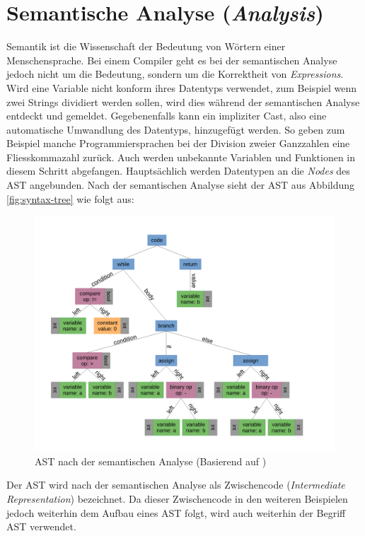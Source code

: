 \section{Semantische Analyse (\textit{Analysis})}
Semantik ist die Wissenschaft der Bedeutung von Wörtern einer Menschensprache. Bei einem Compiler geht es bei der semantischen Analyse jedoch nicht um die Bedeutung, sondern um die Korrektheit von \textit{Expressions}.
Wird eine Variable nicht konform ihres Datentyps verwendet, zum Beispiel wenn zwei Strings dividiert werden sollen, wird dies während der semantischen Analyse entdeckt und gemeldet.
Gegebenenfalls kann ein impliziter Cast, also eine automatische Umwandlung des Datentyps, hinzugefügt werden.
So geben zum Beispiel manche Programmiersprachen bei der Division zweier Ganzzahlen eine Fliesskommazahl zurück.
Auch werden unbekannte Variablen und Funktionen in diesem Schritt abgefangen.
Hauptsächlich werden Datentypen an die \textit{Nodes} des AST angebunden. Nach der semantischen Analyse sieht der AST aus Abbildung \ref{fig:syntax-tree} wie folgt aus:

\begin{figure}[H]
    \centering
    \includegraphics[scale=0.4]{resources/images/AST_with_types.pdf}
    \caption{AST nach der semantischen Analyse (Basierend auf \cite{img:AST})}
    \label{fig:syntax-tree-with-types}
\end{figure}

Der AST wird nach der semantischen Analyse als Zwischencode (\textit{Intermediate Representation}) bezeichnet.
Da dieser Zwischencode in den weiteren Beispielen jedoch weiterhin dem Aufbau eines AST folgt, wird auch weiterhin der Begriff AST verwendet.


